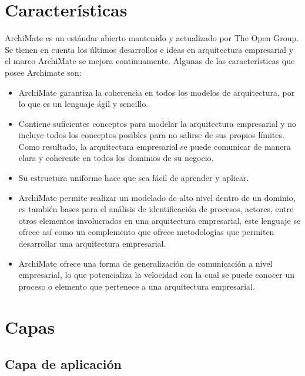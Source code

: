 {	\section{Características}	
	ArchiMate es un  estándar abierto  mantenido y actualizado por The Open Group. Se tienen en cuenta los últimos desarrollos e ideas en arquitectura empresarial y el marco ArchiMate se mejora continuamente. Algunas de las características que posee Archimate son:
    \begin{itemize}
        \item ArchiMate garantiza la coherencia en todos los modelos de arquitectura, por lo que es un lenguaje ágil y sencillo. 
        \item Contiene suficientes conceptos para modelar la arquitectura empresarial y no incluye todos los conceptos posibles para no salirse de sus propios límites. Como resultado, la arquitectura empresarial se puede comunicar de manera clara y coherente en todos los dominios de su negocio. 
        \item Su estructura uniforme hace que sea fácil de aprender y aplicar.
        \item ArchiMate permite realizar un modelado de alto nivel dentro de un dominio, es también bases para el análisis de identificación de procesos, actores, entre otros elementos involucrados en una arquitectura empresarial, este lenguaje se ofrece así como un complemento que ofrece metodologías que permiten desarrollar una arquitectura empresarial.
        \item ArchiMate ofrece una forma de generalización de comunicación a nivel empresarial, lo que potencializa la velocidad con la cual se puede conocer un proceso o elemento que pertenece a una arquitectura empresarial.
    \end{itemize}
    
    \section{Capas}
    
    
    \subsection{Capa de aplicación}
    
}
